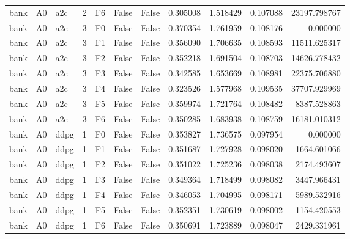 \begin{tabular}{lllrlllrrrr}
      bank &      A0 &       a2c &     2 &  F6 &           False &            False &  0.305008 &  1.518429 & 0.107088 &     23197.798767 \\
      bank &      A0 &       a2c &     3 &  F0 &           False &            False &  0.370354 &  1.761959 & 0.108176 &         0.000000 \\
      bank &      A0 &       a2c &     3 &  F1 &           False &            False &  0.356090 &  1.706635 & 0.108593 &     11511.625317 \\
      bank &      A0 &       a2c &     3 &  F2 &           False &            False &  0.352218 &  1.691504 & 0.108703 &     14626.778432 \\
      bank &      A0 &       a2c &     3 &  F3 &           False &            False &  0.342585 &  1.653669 & 0.108981 &     22375.706880 \\
      bank &      A0 &       a2c &     3 &  F4 &           False &            False &  0.323526 &  1.577968 & 0.109535 &     37707.929969 \\
      bank &      A0 &       a2c &     3 &  F5 &           False &            False &  0.359974 &  1.721764 & 0.108482 &      8387.528863 \\
      bank &      A0 &       a2c &     3 &  F6 &           False &            False &  0.350285 &  1.683938 & 0.108759 &     16181.010312 \\
      bank &      A0 &      ddpg &     1 &  F0 &           False &            False &  0.353827 &  1.736575 & 0.097954 &         0.000000 \\
      bank &      A0 &      ddpg &     1 &  F1 &           False &            False &  0.351687 &  1.727928 & 0.098020 &      1664.601066 \\
      bank &      A0 &      ddpg &     1 &  F2 &           False &            False &  0.351022 &  1.725236 & 0.098038 &      2174.493607 \\
      bank &      A0 &      ddpg &     1 &  F3 &           False &            False &  0.349364 &  1.718499 & 0.098082 &      3447.966431 \\
      bank &      A0 &      ddpg &     1 &  F4 &           False &            False &  0.346053 &  1.704995 & 0.098171 &      5989.532916 \\
      bank &      A0 &      ddpg &     1 &  F5 &           False &            False &  0.352351 &  1.730619 & 0.098002 &      1154.420553 \\
      bank &      A0 &      ddpg &     1 &  F6 &           False &            False &  0.350691 &  1.723889 & 0.098047 &      2429.331961 \\

\end{tabular}
